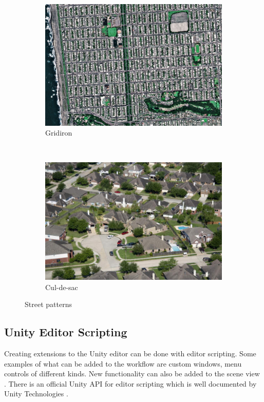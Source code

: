\begin{figure}[H]
\centering
\begin{subfigure}{.4\linewidth}
  \centering
  \includegraphics[width=1\linewidth]{Planning report/images/grid_pattern.jpg}
  \caption{Gridiron}
  \label{fig:street_pattern}
\end{subfigure}
~
\begin{subfigure}{.4\linewidth}
  \centering
  \includegraphics[width=1\linewidth]{Planning report/images/culdesac.jpg}
  \caption{Cul-de-sac}
\end{subfigure}
\caption{Street patterns}
\label{fig:both_pattern}
\end{figure}

\newpage
\subsection{Unity Editor Scripting}
Creating extensions to the Unity editor can be done with editor scripting. Some examples of what can be added to the workflow are custom windows, menu controls of different kinds. New functionality can also be added to the scene view \cite{unity-extending-editor}. There is an official Unity API for editor scripting which is well documented by Unity Technologies \cite{unity-editor-docs}.